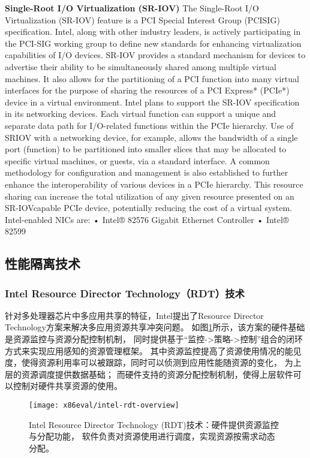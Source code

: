 \textbf{Single-Root I/O Virtualization (SR-IOV)}
The Single-Root I/O Virtualization (SR-IOV)
feature is a PCI Special Interest Group (PCISIG)
specification. Intel, along with other
industry leaders, is actively participating in
the PCI-SIG working group to define new
standards for enhancing virtualization capabilities
of I/O devices. SR-IOV provides a
standard mechanism for devices to advertise
their ability to be simultaneously shared
among multiple virtual machines. It also
allows for the partitioning of a PCI function
into many virtual interfaces for the purpose
of sharing the resources of a PCI Express*
(PCIe*) device in a virtual environment. Intel
plans to support the SR-IOV specification in
its networking devices.
Each virtual function can support a unique
and separate data path for I/O-related functions
within the PCIe hierarchy. Use of SRIOV
with a networking device, for example,
allows the bandwidth of a single port (function)
to be partitioned into smaller slices that
may be allocated to specific virtual machines,
or guests, via a standard interface. A common
methodology for configuration and management
is also established to further
enhance the interoperability of various
devices in a PCIe hierarchy. This resource
sharing can increase the total utilization of
any given resource presented on an SR-IOVcapable
PCIe device, potentially reducing the
cost of a virtual system.
Intel-enabled NICs are:
• Intel® 82576 Gigabit Ethernet Controller
• Intel® 82599


\subsection{性能隔离技术}

\subsubsection*{Intel Resource Director Technology（RDT）技术}

针对多处理器芯片中多应用共享的特征，Intel提出了Resource Director Technology方案来解决多应用资源共享冲突问题。
如图\ref{fig:intel-rdt-overview}所示，该方案的硬件基础是资源监控与资源分配控制机制，
同时提供基于``监控->策略->控制''组合的闭环方式来实现应用感知的资源管理框架。
其中资源监控提高了资源使用情况的能见度，使得资源利用率可以被跟踪，同时可以侦测到应用性能随资源的变化，
为上层的资源调度提供数据基础；
而硬件支持的资源分配控制机制，使得上层软件可以控制对硬件共享资源的使用。

\begin{figure}[H]
  \centering
  \texttt{[image: x86eval/intel-rdt-overview]}
  \caption[Intel Resource Director Technology (RDT) 技术示意图]{
    Intel Resource Director Technology (RDT)技术：硬件提供资源监控与分配功能，
    软件负责对资源使用进行调度，实现资源按需求动态分配。}
  \label{fig:intel-rdt-overview}
\end{figure}

